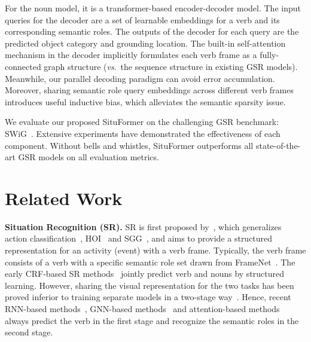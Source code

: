 \documentclass[letterpaper]{article} %
\newcommand{\vs}{\textit{vs}.}
\begin{document}
For the noun model, it is a transformer-based encoder-decoder model. The input queries for the decoder are a set of learnable embeddings for a verb and its corresponding semantic roles. The outputs of the decoder for each query are the predicted object category and grounding location. The built-in self-attention mechanism in the decoder implicitly formulates each verb frame as a fully-connected graph structure (\vs~the sequence structure in existing GSR models). Meanwhile, our parallel decoding paradigm can avoid error accumulation. Moreover, sharing semantic role query embeddings across different verb frames introduces useful inductive bias, which alleviates the semantic sparsity issue.


We evaluate our proposed SituFormer on the challenging GSR benchmark: SWiG~\cite{pratt2020grounded}. Extensive experiments have demonstrated the effectiveness of each component. Without bells and whistles, SituFormer outperforms all state-of-the-art GSR models on all evaluation metrics.

















\section{Related Work}
\noindent\textbf{Situation Recognition (SR).}
SR is first proposed by~\cite{gupta2015visual,yatskar2016situation}, which generalizes action classification~\cite{carreira2017quo,9151084}, HOI~\cite{liao2020ppdm,zou2021end,wei2020hose} and SGG~\cite{chen2019counterfactual,cong2021spatial}, and aims to provide a structured representation for an activity (event) with a verb frame. Typically, the verb frame consists of a verb with a specific semantic role set drawn from FrameNet~\cite{10.3115/980845.980860}. The early CRF-based SR methods~\cite{yatskar2016situation, yatskar2017commonly} jointly predict verb and nouns by structured learning.
However, sharing the visual representation for the two tasks has been proved inferior to training separate models in a two-stage way~\cite{mallya2017recurrent}.
Hence, recent RNN-based methods~\cite{mallya2017recurrent}, GNN-based methods~\cite{li2017situation,suhail2019mixture} and attention-based methods~\cite{9156513} always predict the verb in the first stage and recognize the semantic roles in the second stage.
\end{document}
